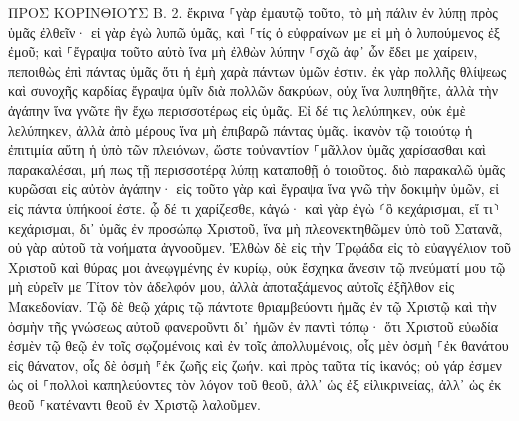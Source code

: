 \documentclass[twoside, 9pt]{extreport}
\begin{document}
ΠΡΟΣ ΚΟΡΙΝΘΙΟΥΣ Β.
2.
ἔκρινα ⸀γὰρ ἐμαυτῷ τοῦτο, τὸ μὴ πάλιν ἐν λύπῃ πρὸς ὑμᾶς ἐλθεῖν· 
εἰ γὰρ ἐγὼ λυπῶ ὑμᾶς, καὶ ⸀τίς ὁ εὐφραίνων με εἰ μὴ ὁ λυπούμενος ἐξ ἐμοῦ; 
καὶ ⸀ἔγραψα τοῦτο αὐτὸ ἵνα μὴ ἐλθὼν λύπην ⸀σχῶ ἀφ᾽ ὧν ἔδει με χαίρειν, πεποιθὼς ἐπὶ πάντας ὑμᾶς ὅτι ἡ ἐμὴ χαρὰ πάντων ὑμῶν ἐστιν. 
ἐκ γὰρ πολλῆς θλίψεως καὶ συνοχῆς καρδίας ἔγραψα ὑμῖν διὰ πολλῶν δακρύων, οὐχ ἵνα λυπηθῆτε, ἀλλὰ τὴν ἀγάπην ἵνα γνῶτε ἣν ἔχω περισσοτέρως εἰς ὑμᾶς. 
Εἰ δέ τις λελύπηκεν, οὐκ ἐμὲ λελύπηκεν, ἀλλὰ ἀπὸ μέρους ἵνα μὴ ἐπιβαρῶ πάντας ὑμᾶς. 
ἱκανὸν τῷ τοιούτῳ ἡ ἐπιτιμία αὕτη ἡ ὑπὸ τῶν πλειόνων, 
ὥστε τοὐναντίον ⸀μᾶλλον ὑμᾶς χαρίσασθαι καὶ παρακαλέσαι, μή πως τῇ περισσοτέρᾳ λύπῃ καταποθῇ ὁ τοιοῦτος. 
διὸ παρακαλῶ ὑμᾶς κυρῶσαι εἰς αὐτὸν ἀγάπην· 
εἰς τοῦτο γὰρ καὶ ἔγραψα ἵνα γνῶ τὴν δοκιμὴν ὑμῶν, εἰ εἰς πάντα ὑπήκοοί ἐστε. 
ᾧ δέ τι χαρίζεσθε, κἀγώ· καὶ γὰρ ἐγὼ ⸂ὃ κεχάρισμαι, εἴ τι⸃ κεχάρισμαι, δι᾽ ὑμᾶς ἐν προσώπῳ Χριστοῦ, 
ἵνα μὴ πλεονεκτηθῶμεν ὑπὸ τοῦ Σατανᾶ, οὐ γὰρ αὐτοῦ τὰ νοήματα ἀγνοοῦμεν. 
Ἐλθὼν δὲ εἰς τὴν Τρῳάδα εἰς τὸ εὐαγγέλιον τοῦ Χριστοῦ καὶ θύρας μοι ἀνεῳγμένης ἐν κυρίῳ, 
οὐκ ἔσχηκα ἄνεσιν τῷ πνεύματί μου τῷ μὴ εὑρεῖν με Τίτον τὸν ἀδελφόν μου, ἀλλὰ ἀποταξάμενος αὐτοῖς ἐξῆλθον εἰς Μακεδονίαν. 
Τῷ δὲ θεῷ χάρις τῷ πάντοτε θριαμβεύοντι ἡμᾶς ἐν τῷ Χριστῷ καὶ τὴν ὀσμὴν τῆς γνώσεως αὐτοῦ φανεροῦντι δι᾽ ἡμῶν ἐν παντὶ τόπῳ· 
ὅτι Χριστοῦ εὐωδία ἐσμὲν τῷ θεῷ ἐν τοῖς σῳζομένοις καὶ ἐν τοῖς ἀπολλυμένοις, 
οἷς μὲν ὀσμὴ ⸀ἐκ θανάτου εἰς θάνατον, οἷς δὲ ὀσμὴ ⸁ἐκ ζωῆς εἰς ζωήν. καὶ πρὸς ταῦτα τίς ἱκανός; 
οὐ γάρ ἐσμεν ὡς οἱ ⸀πολλοὶ καπηλεύοντες τὸν λόγον τοῦ θεοῦ, ἀλλ᾽ ὡς ἐξ εἰλικρινείας, ἀλλ᾽ ὡς ἐκ θεοῦ ⸀κατέναντι θεοῦ ἐν Χριστῷ λαλοῦμεν. 
\end{document}
